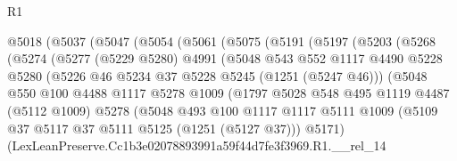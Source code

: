 \begin{lexlean}{R1}
\begin{coremodule}
                @5018
                  (@5037
                    (@5047
                      (@5054
                        (@5061
                          (@5075
                            (@5191
                              (@5197
                                (@5203
                                  (@5268
                                    (@5274
                                      (@5277
                                        (@5229 @5280)
                                        @4991
                                        (@5048
                                          @543
                                          @552
                                          @1117
                                          @4490
                                          @5228
                                          @5280
                                          (@5226 @46 @5234 @37 @5228 @5245 (@1251 (@5247 @46)))
                                          (@5048
                                            @550
                                            @100
                                            @4488
                                            @1117
                                            @5278
                                            @1009
                                            (@1797
                                              @5028
                                              @548
                                              @495
                                              @1119
                                              @4487
                                              (@5112 @1009)
                                              @5278
                                              (@5048
                                                @493
                                                @100
                                                @1117
                                                @1117
                                                @5111
                                                @1009
                                                (@5109
                                                  @37
                                                  @5117
                                                  @37
                                                  @5111
                                                  @5125
                                                  (@1251 (@5127 @37)))
                                                @5171)
                                              (LexLeanPreserve.Cc1b3e02078893991a59f44d7fe3f3969.R1.__rel_14

\end{coremodule}
\end{lexlean}
